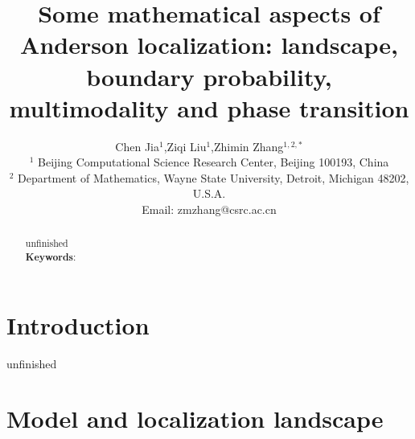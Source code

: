 \documentclass[a4paper,11pt]{article}
\newcommand{\paperfont}{\fontsize{11pt}{1.2\baselineskip}\selectfont}
\begin{document}
\theoremstyle{definition}
\makeatletter
\thm@headfont{\bf}
\makeatother
\newtheorem{definition}{Definition}
\newtheorem{example}{Example}
\newtheorem{theorem}{Theorem}
\newtheorem{lemma}{Lemma}
\newtheorem{corollary}{Corollary}
\newtheorem{remark}{Remark}
\newtheorem{proposition}{Proposition}

\lhead{}
\rhead{}
\lfoot{}
\rfoot{}

\renewcommand{\refname}{References}
\renewcommand{\figurename}{Fig.}
\renewcommand{\tablename}{Table}
\renewcommand{\proofname}{Proof}

\newcommand{\diag}{\mathrm{diag}}
\newcommand{\tr}{\mathrm{tr}}
\newcommand{\Enum}{\mathbb{E}}
\newcommand{\Pnum}{\mathbb{P}}
\newcommand{\Rnum}{\mathbb{R}}
\newcommand{\Cnum}{\mathbb{C}}
\newcommand{\Znum}{\mathbb{Z}}
\newcommand{\Nnum}{\mathbb{N}}
\newcommand{\abs}[1]{\left\vert#1\right\vert}
\newcommand{\set}[1]{\left\{#1\right\}}
\newcommand{\norm}[1]{\left\Vert#1\right\Vert}
\newcommand{\bx}{\mathbf{x}}

\title{Some mathematical aspects of Anderson localization: landscape, boundary probability, multimodality and phase transition}
\author{Chen Jia$^{1}$,\;\;\;Ziqi Liu$^{1}$,\;\;\;Zhimin Zhang$^{1,2,*}$\\
\footnotesize $^1$ Beijing Computational Science Research Center, Beijing 100193, China \\
\footnotesize $^2$ Department of Mathematics, Wayne State University, Detroit, Michigan 48202, U.S.A.\\
\footnotesize Email: zmzhang@csrc.ac.cn}
\date{}
\maketitle
\thispagestyle{empty}

\paperfont

\begin{abstract}
{\color{red} unfinished} \\

\noindent
\textbf{Keywords}:

\end{abstract}

\section{Introduction}

{\color{red} unfinished}

\section{Model and localization landscape}
\end{document}
